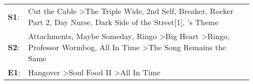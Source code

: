 \begin{supertabular}{p{0.03\textwidth}p{0.92\textwidth}}
 \textbf{S1}:  &                     Cut the Cable\textsuperscript{} \textgreater \enspace The Triple Wide\textsuperscript{}, \enspace 2nd Self\textsuperscript{}, \enspace Breaker\textsuperscript{}, \enspace Rocker Part 2\textsuperscript{}, \enspace Day Nurse\textsuperscript{}, \enspace Dark Side of the Street[1]\textsuperscript{}, 's Theme\textsuperscript{}  \enspace  \\
 \textbf{S2}:  &  Attachments\textsuperscript{}, \enspace Maybe Someday\textsuperscript{}, \enspace Ringo\textsuperscript{} \textgreater \enspace Big Heart\textsuperscript{} \textgreater \enspace Ringo\textsuperscript{}, \enspace Professor Wormbog\textsuperscript{}, \enspace All In Time\textsuperscript{} \textgreater \enspace The Song Remains the Same\textsuperscript{}  \enspace  \\
 \textbf{E1}:  &                                                                                                                                                                                                                                Hangover\textsuperscript{} \textgreater \enspace Soul Food II\textsuperscript{} \textgreater \enspace All In Time\textsuperscript{}  \enspace  \\
\end{supertabular}
